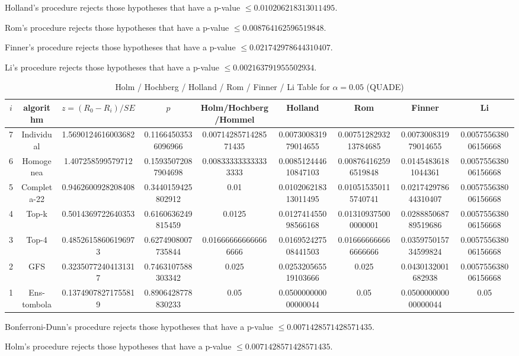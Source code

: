 \documentclass[a4paper,10pt]{article}
\begin{document}
\begin{landscape}
Holland's procedure rejects those hypotheses that have a p-value $\le0.010206218313011495$.


Rom's procedure rejects those hypotheses that have a p-value $\le0.008764162596519848$.


Finner's procedure rejects those hypotheses that have a p-value $\le0.021742978644310407$.


Li's procedure rejects those hypotheses that have a p-value $\le0.002163791955502934$.



\newpage

\begin{table}[!htp]
\centering\scriptsize
\caption{Holm / Hochberg / Holland / Rom / Finner / Li Table for $\alpha=0.05$ (QUADE)}
\begin{tabular}{ccccccccc}
$i$&algorithm&$z=(R_0 - R_i)/SE$&$p$&Holm/Hochberg/Hommel&Holland&Rom&Finner&Li\\
\hline
7&Individual&1.5690124616003682&0.11664503536096966&0.0071428571428571435&0.007300831979014655&0.0075128293213784685&0.007300831979014655&0.005755638006156668\\
6&Homogenea&1.407258599579712&0.15935072087904698&0.008333333333333333&0.008512444610847103&0.008764162596519848&0.01454836181044361&0.005755638006156668\\
5&Completa-22&0.9462600928208408&0.3440159425802912&0.01&0.010206218313011495&0.010515350115740741&0.021742978644310407&0.005755638006156668\\
4&Top-k&0.5014369722640353&0.6160636249815459&0.0125&0.012741455098566168&0.013109375000000001&0.028885068789519686&0.005755638006156668\\
3&Top-4&0.48526158606196973&0.6274908007735844&0.016666666666666666&0.016952427508441503&0.016666666666666666&0.035975015734599824&0.005755638006156668\\
2&GFS&0.32350772404131317&0.7463107588303342&0.025&0.025320565519103666&0.025&0.0430132001682938&0.005755638006156668\\
1&Ens-tombola&0.13749078271755819&0.8906428778830233&0.05&0.050000000000000044&0.05&0.050000000000000044&0.05\\
\hline
\end{tabular}
\end{table}
Bonferroni-Dunn's procedure rejects those hypotheses that have a p-value $\le0.0071428571428571435$.


Holm's procedure rejects those hypotheses that have a p-value $\le0.0071428571428571435$.



\end{landscape}
\end{document}
